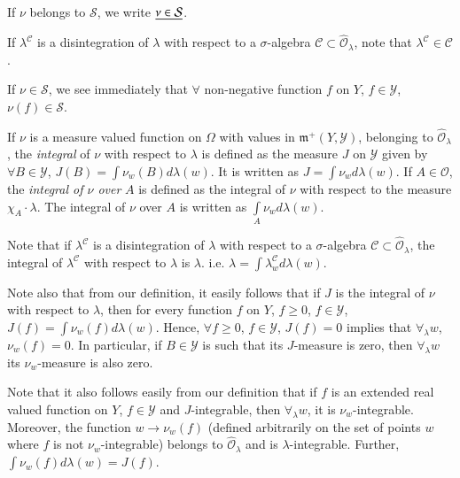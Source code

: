 If $\nu$ belongs to $\mathcal{S}$, we write $\underline{\nu \in
  \mathcal{S}}$. 

If $\lambda^\mathscr{C}$ is a disintegration of $\lambda$ with respect
to a $\sigma$-algebra $\mathscr{C} \subset
\hat{\mathscr{O}}_\lambda$, note that $\lambda^\mathscr{C} \in
\mathscr{C}$. 

If $\nu \in \mathcal{S}$, we see immediately that $\forall$
non-negative function $f$ on $Y$, $f \in\mathscr{Y}$, $\nu(f) \in
\mathcal{S}$.\pageoriginale 

\begin{defn}\label{part1:chap2:def14}
If $\nu$ is a measure valued function on $\Omega$ with values in
$\mathfrak{m}^+ (Y, \mathscr{Y})$, belonging to
$\hat{\mathscr{O}}_\lambda$, the {\em integral} of $\nu$ with respect
to $\lambda$ is defined as the measure $J$ on $\mathscr{Y}$ given by
$\forall B \in \mathscr{Y}$, $J(B) = \int \nu_w (B) d \lambda (w)$. It
is written as $J = \int \nu_w d \lambda (w)$. If $A \in\mathscr{O}$,
the {\em integral of $\nu$ over } $A$ is defined as the integral of
$\nu$ with respect to the measure $\chi_A \cdot \lambda$. The integral
of $\nu$ over $A$ is written as $\int\limits_A \nu_w d\lambda(w)$. 
\end{defn}

Note that if $\lambda^\mathscr{C}$ is a disintegration of $\lambda$
with respect to a $\sigma$-algebra $\mathscr{C}\subset
\hat{\mathscr{O}}_\lambda$, the integral of $\lambda^\mathscr{C}$ with
respect to $\lambda$ is $\lambda$. i.e. $\lambda = \int
\lambda^\mathscr{C}_w d \lambda (w) $. 

Note also that from our definition, it easily follows that if $J$ is
the integral of $\nu$ with respect to $\lambda$, then for every
function $f$ on $Y$, $f \geq 0$, $f \in \mathscr{Y}$, $J(f) =
\int\nu_w (f) d \lambda (w)$. Hence, $\forall f \geq 0$, $f \in
\mathscr{Y}$, $J(f)=0$ implies that $\forall_\lambda w$, $\nu_w (f) =
0$. In particular, if $B \in \mathscr{Y}$ is such that its $J$-measure
is zero, then $\forall_\lambda w $ its $\nu_w$-measure is also zero. 

Note that it also follows easily from our definition that if $f$ is an
extended real valued function on $Y$, $f \in \mathscr{Y}$ and
$J$-integrable, then $\forall_\lambda w$, it is
$\nu_w$-integrable. Moreover, the function $w \to \nu_w (f)$ (defined
arbitrarily on the set of points $w$ where $f$ is not
$\nu_w$-integrable) belongs to $\hat{\mathscr{O}}_\lambda$ and is
$\lambda$-integrable. Further, $\int \nu_w (f)d \lambda (w) = J(f)$. 

